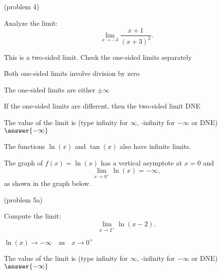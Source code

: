 \documentclass[handout]{ximera}
\begin{document}
\begin{problem}(problem 4)
  
	Analyze the limit:
  \[
  \lim_{x \to -3} \frac{x+1}{(x+3)^2}.
  \]
  
    \begin{hint}
      This is a two-sided limit. Check the one-sided limits separately
    \end{hint}
    \begin{hint}
      Both one-sided limits involve division by zero
    \end{hint}
    \begin{hint}
      The one-sided limits are either $\pm \infty$
    \end{hint}
		\begin{hint}
		  If the one-sided limits are different, then the two-sided limit DNE
		\end{hint}	
		The value of the limit is
		(type infinity for $\infty$, -infinity for $-\infty$ or DNE)
		 $\answer{-\infty}$
		
\end{problem}

The functions $\ln(x)$ and $\tan(x)$ also have infinite limits.

\begin{example}[example 5]
The graph of $f(x) = \ln(x)$ has a vertical asymptote at $x=0$
and 
\[
\lim_{x\to 0^+} \ln(x) = -\infty,
\]
as shown in the graph below.


\begin{center}
\end{center}


\end{example}


\begin{problem}(problem 5a)
  
	Compute the limit:
  \[
  \lim_{x \to {2^+}} \ln(x-2).
  \]
		\begin{hint}
		  $\ln(x) \to -\infty \quad \text{as} \quad x \to 0^+$
		\end{hint}	
		The value of the limit is
		(type infinity for $\infty$, -infinity for $-\infty$ or DNE)
		 $\answer{-\infty}$
		
\end{problem}
\end{document}
